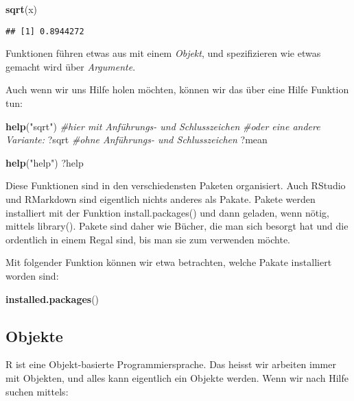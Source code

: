 \documentclass[
]{book}
\newenvironment{Shaded}{\begin{snugshade}}{\end{snugshade}}
\newcommand{\CommentTok}[1]{\textcolor[rgb]{0.56,0.35,0.01}{\textit{#1}}}
\newcommand{\KeywordTok}[1]{\textcolor[rgb]{0.13,0.29,0.53}{\textbf{#1}}}
\newcommand{\NormalTok}[1]{#1}
\newcommand{\StringTok}[1]{\textcolor[rgb]{0.31,0.60,0.02}{#1}}
\begin{document}
\begin{Shaded}
\begin{Highlighting}[]
\KeywordTok{sqrt}\NormalTok{(x)}
\end{Highlighting}
\end{Shaded}

\begin{verbatim}
## [1] 0.8944272
\end{verbatim}

Funktionen führen etwas aus mit einem \emph{Objekt}, und spezifizieren wie etwas gemacht wird über \emph{Argumente}.

Auch wenn wir uns Hilfe holen möchten, können wir das über eine Hilfe Funktion tun:

\begin{Shaded}
\begin{Highlighting}[]
\KeywordTok{help}\NormalTok{(}\StringTok{"sqrt"}\NormalTok{) }\CommentTok{#hier mit Anführungs- und Schlusszeichen}
\CommentTok{#oder eine andere Variante:}
\NormalTok{?sqrt }\CommentTok{#ohne Anführungs- und Schlusszeichen}
\NormalTok{?mean}

\KeywordTok{help}\NormalTok{(}\StringTok{"help"}\NormalTok{) }
\NormalTok{?help}
\end{Highlighting}
\end{Shaded}

Diese Funktionen sind in den verschiedensten Paketen organisiert. Auch RStudio und RMarkdown sind eigentlich nichts anderes als Pakate. Pakete werden installiert mit der Funktion install.packages() und dann geladen, wenn nötig, mittels library(). Pakete sind daher wie Bücher, die man sich besorgt hat und die ordentlich in einem Regal sind, bis man sie zum verwenden möchte.

Mit folgender Funktion können wir etwa betrachten, welche Pakate installiert worden sind:

\begin{Shaded}
\begin{Highlighting}[]
\KeywordTok{installed.packages}\NormalTok{()}
\end{Highlighting}
\end{Shaded}

\hypertarget{objekte}{%
\subsection{Objekte}\label{objekte}}

R ist eine Objekt-basierte Programmiersprache. Das heisst wir arbeiten immer mit Objekten, und alles kann eigentlich ein Objekte werden. Wenn wir nach Hilfe suchen mittels:
\end{document}
